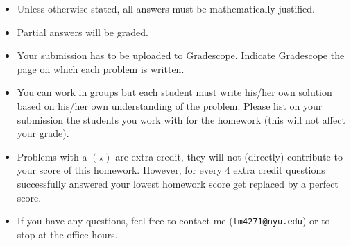 \centerline{}
{\small
	\begin{itemize}
		\item Unless otherwise stated, all answers must be mathematically justified.
		\item Partial answers will be graded. 
		\item Your submission has to be uploaded to Gradescope. Indicate Gradescope the page on which each problem is written.
		\item You can work in groups but each student must write his/her own solution based on his/her own understanding of the problem. Please list on your submission the students you work with for the homework (this will not affect your grade).
		\item Problems with a $(\star)$ are extra credit, they will not (directly) contribute to your score of this homework. However, for every $4$ extra credit questions successfully answered your lowest homework score get replaced by a perfect score.
		\item If you have any questions, feel free to contact me (\texttt{lm4271@nyu.edu}) or to stop at the office hours.
	\end{itemize}
}
\vspace{-0.4cm}
\centerline{}
\vspace{0.5cm}

